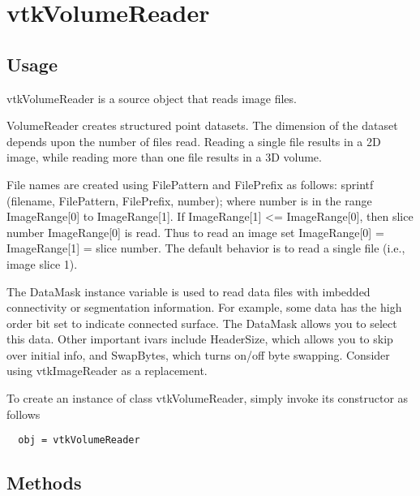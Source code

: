 \section{vtkVolumeReader}

\subsection{Usage}

 vtkVolumeReader is a source object that reads image files.

 VolumeReader creates structured point datasets. The dimension of the 
 dataset depends upon the number of files read. Reading a single file 
 results in a 2D image, while reading more than one file results in a 
 3D volume.

 File names are created using FilePattern and FilePrefix as follows:
 sprintf (filename, FilePattern, FilePrefix, number);
 where number is in the range ImageRange[0] to ImageRange[1]. If
 ImageRange[1] <= ImageRange[0], then slice number ImageRange[0] is
 read. Thus to read an image set ImageRange[0] = ImageRange[1] = slice 
 number. The default behavior is to read a single file (i.e., image slice 1).

 The DataMask instance variable is used to read data files with imbedded
 connectivity or segmentation information. For example, some data has
 the high order bit set to indicate connected surface. The DataMask allows
 you to select this data. Other important ivars include HeaderSize, which
 allows you to skip over initial info, and SwapBytes, which turns on/off
 byte swapping. Consider using vtkImageReader as a replacement.

To create an instance of class vtkVolumeReader, simply
invoke its constructor as follows
\begin{verbatim}
  obj = vtkVolumeReader
\end{verbatim}
\subsection{Methods}

